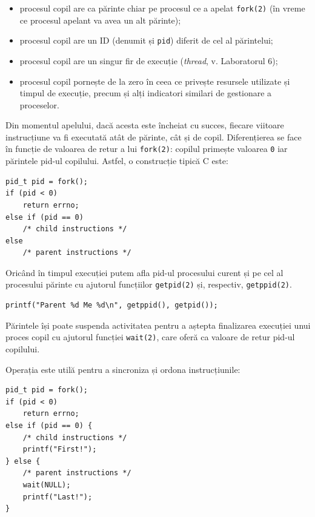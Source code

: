 \documentclass[12pt,a4paper]{article}
\begin{document}
\begin{itemize}
  \setlength{\itemsep}{0.75pt}
  \item procesul copil are ca părinte chiar pe 
  procesul ce a apelat \texttt{fork(2)}
  (în vreme ce procesul apelant va avea un alt părinte);
  \item procesul copil are un ID (denumit și \texttt{pid}) 
  diferit de cel al părintelui;
  \item procesul copil are un singur fir de execuție 
  (\textit{thread}, v. Laboratorul 6);
  \item procesul copil pornește de la zero în ceea ce privește 
  resursele utilizate și timpul de execuție, 
  precum și alți indicatori similari de gestionare a proceselor.
\end{itemize}

Din momentul apelului, dacă acesta este încheiat cu succes, 
fiecare viitoare instrucțiune va fi executată atât de părinte, 
cât și de copil. 
Diferențierea se face în funcție de
valoarea de retur a lui \texttt{fork(2)}: 
copilul primește valoarea \texttt{0} iar părintele
pid-ul copilului. 
Astfel, o construcție tipică C este:

\begin{lstlisting}
pid_t pid = fork();
if (pid < 0)
    return errno;
else if (pid == 0)
    /* child instructions */
else
    /* parent instructions */
\end{lstlisting}

Oricând în timpul execuției putem afla pid-ul procesului curent 
și pe cel al procesului părinte 
cu ajutorul funcțiilor \texttt{getpid(2)} și, respectiv, \texttt{getppid(2)}.

\begin{lstlisting}
printf("Parent %d Me %d\n", getppid(), getpid());
\end{lstlisting}

Părintele își poate suspenda activitatea 
pentru a aștepta finalizarea execuției unui proces copil 
cu ajutorul funcției \texttt{wait(2)}, 
care oferă ca valoare de retur pid-ul copilului.

Operația este utilă pentru a sincroniza și ordona instrucțiunile:

\begin{lstlisting}
pid_t pid = fork();
if (pid < 0)
    return errno;
else if (pid == 0) {
    /* child instructions */
    printf("First!");
} else {
    /* parent instructions */
    wait(NULL);
    printf("Last!");
}
\end{lstlisting}
\end{document}
